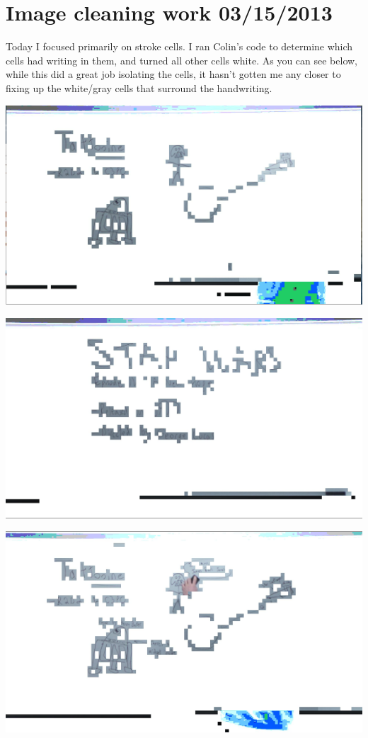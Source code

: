 \documentclass[]{article}
\begin{document}
	\section{Image cleaning work 03/15/2013}
	
	Today I focused primarily on stroke cells. I ran Colin's code to determine which cells had writing in them, and turned all other cells white. As you can see below, while this did a great job isolating the cells, it hasn't gotten me any closer to fixing up the white/gray cells that surround the handwriting.
	
	\includegraphics[scale=0.5]{images/Cells1.png}
	
	\includegraphics[scale=0.5]{images/Cells2.png}
	
	\includegraphics[scale=0.5]{images/Cells3.png}
	
\end{document}
